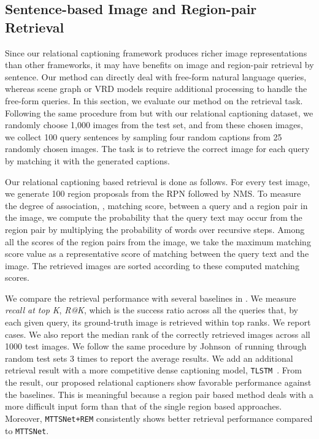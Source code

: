 \subsection{Sentence-based Image and Region-pair Retrieval}
Since our relational captioning framework produces richer image representations than other frameworks, it may have benefits on image {and}
region-pair retrieval by sentence.
{Our method can directly deal with free-form natural language queries, whereas scene graph or VRD models require additional processing to handle the free-form queries.} {In this section,} we evaluate our method on the retrieval task.
Following the same procedure 
from \cite{johnson2016densecap} but with our relational captioning dataset,
we randomly choose 1,000 images from the test set, and from these chosen images, we collect 100 query sentences by sampling four random captions from 25 randomly chosen images.
The task is to retrieve the correct image for each query by matching it with the generated captions.

{Our relational captioning based retrieval is done as follows.}
For every test image, we generate 100 region proposals from the RPN followed by NMS.
{To measure the degree of association, \ie, matching score,}
between a query and a region pair in the image, we compute the probability that the query text may occur from the region pair by multiplying the probability of words over recursive steps.
Among all the scores {of} the region pairs from the image, we take the maximum matching score value as a representative score of 
{matching between the query text and} the image.
The retrieved images are sorted {according to} these computed matching scores.











{
We compare the retrieval performance with several baselines in .
We measure \emph{recall at top K}, \emph{R@K}, which is the success ratio across all the queries that, by each given query,
its ground-truth image is retrieved within top  ranks.
We report  cases.
}
We also report the median rank of the correctly retrieved images across all 1000 test images.
{We follow the same procedure by Johnson~\etal of running through random test sets 3 times to report the average results.
{We add an additional retrieval result with a more competitive dense captioning model, \texttt{TLSTM}~\cite{Yang_2017_CVPR}.}
From the result, our proposed relational captioners show favorable performance against the baselines.
{This is meaningful because a region pair based method deals with a more difficult input form than that of the single region based approaches.}
}
{Moreover, \texttt{MTTSNet+REM} {consistently} shows better retrieval performance compared to \texttt{MTTSNet}.}





